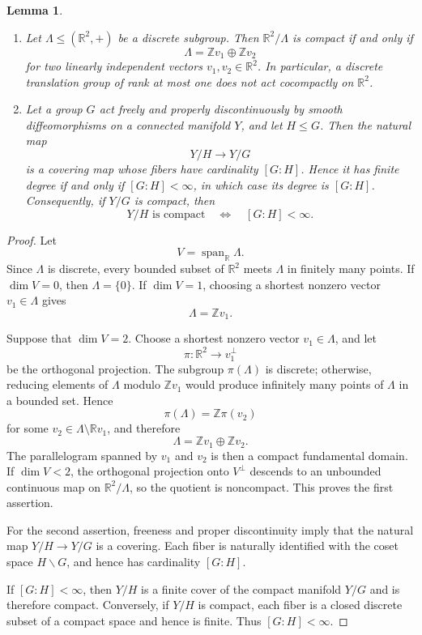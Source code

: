 \documentclass[a4paper,11pt]{amsart}
\numberwithin{equation}{section}
\theoremstyle{plain}
\newtheorem{lem}[thm]{Lemma}
\begin{document}
\begin{lem}\label{lem:planar_quotient_groups}
\begin{enumerate}
\item Let $\Lambda\leq(\mathbb R^2,+)$ be a discrete subgroup. Then
$\mathbb R^2/\Lambda$ is compact if and only if
\[
\Lambda=\mathbb Zv_1\oplus\mathbb Zv_2
\]
for two linearly independent vectors $v_1,v_2\in\mathbb R^2$.
In particular, a discrete translation group of rank at most one does
not act cocompactly on $\mathbb R^2$.

\item Let a group $G$ act freely and properly discontinuously by
smooth diffeomorphisms on a connected manifold $Y$, and let $H\leq G$.
Then the natural map
\[
Y/H\longrightarrow Y/G
\]
is a covering map whose fibers have cardinality $[G:H]$. Hence it has
finite degree if and only if $[G:H]<\infty$, in which case its degree
is $[G:H]$. Consequently, if $Y/G$ is compact, then
\[
Y/H\text{ is compact}
\quad\Longleftrightarrow\quad
[G:H]<\infty.
\]
\end{enumerate}
\end{lem}

\begin{proof}
Let
\[
V=\operatorname{span}_{\mathbb R}\Lambda.
\]
Since $\Lambda$ is discrete, every bounded subset of $\mathbb R^2$
meets $\Lambda$ in finitely many points. If $\dim V=0$, then
$\Lambda=\{0\}$. If $\dim V=1$, choosing a shortest nonzero vector
$v_1\in\Lambda$ gives
\[
\Lambda=\mathbb Zv_1.
\]

Suppose that $\dim V=2$. Choose a shortest nonzero vector
$v_1\in\Lambda$, and let
\[
\pi:\mathbb R^2\longrightarrow v_1^\perp
\]
be the orthogonal projection. The subgroup $\pi(\Lambda)$ is discrete;
otherwise, reducing elements of $\Lambda$ modulo $\mathbb Zv_1$ would
produce infinitely many points of $\Lambda$ in a bounded set. Hence
\[
\pi(\Lambda)=\mathbb Z\pi(v_2)
\]
for some $v_2\in\Lambda\setminus\mathbb Rv_1$, and therefore
\[
\Lambda=\mathbb Zv_1\oplus\mathbb Zv_2.
\]
The parallelogram spanned by $v_1$ and $v_2$ is then a compact
fundamental domain. If $\dim V<2$, the orthogonal projection onto
$V^\perp$ descends to an unbounded continuous map on
$\mathbb R^2/\Lambda$, so the quotient is noncompact. This proves
the first assertion.

For the second assertion, freeness and proper discontinuity imply that
the natural map $Y/H\to Y/G$ is a covering. Each fiber is naturally
identified with the coset space $H\backslash G$, and hence has
cardinality $[G:H]$.

If $[G:H]<\infty$, then $Y/H$ is a finite cover of the compact manifold
$Y/G$ and is therefore compact. Conversely, if $Y/H$ is compact, each
fiber is a closed discrete subset of a compact space and hence is
finite. Thus $[G:H]<\infty$.
\end{proof}
\end{document}
